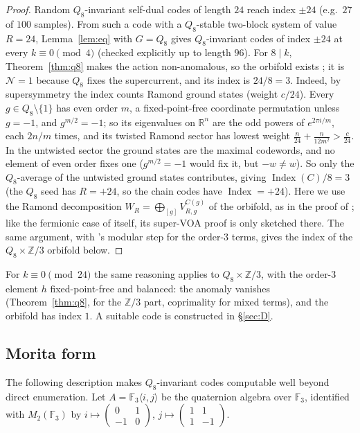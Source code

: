 \documentclass[11pt]{amsart}
\theoremstyle{definition}
\newcommand{\F}{\mathbb{F}_3}
\newcommand{\Index}{\operatorname{Index}}
\begin{document}
\begin{proof}
Random $Q_8$-invariant self-dual codes of length $24$ reach index $\pm24$ (e.g.\ $27$ of $100$
samples). From such a code with a $Q_8$-stable two-block system of value $R=24$, Lemma~\ref{lem:eq}
with $G=Q_8$ gives $Q_8$-invariant codes of index $\pm24$ at every $k\equiv0\pmod4$ (checked explicitly
up to length $96$). For $8\mid k$, Theorem~\ref{thm:q8} makes the action non-anomalous, so the orbifold
exists \cite[Thm.~4.2]{GJF}; it is $\mathcal N=1$ because $Q_8$ fixes the supercurrent, and its index
is $24/8=3$. Indeed, by supersymmetry the index counts Ramond ground states (weight $c/24$). Every
$g\in Q_8\setminus\{1\}$ has even order $m$, a fixed-point-free coordinate permutation unless $g=-1$, and
$g^{m/2}=-1$; so its eigenvalues on $\mathbb R^n$ are the odd powers of $e^{2\pi i/m}$, each $2n/m$ times, and
its twisted Ramond sector has lowest weight $\tfrac n{24}+\tfrac n{12m^2}>\tfrac c{24}$. In the untwisted sector
the ground states are the maximal codewords, and no element of even order fixes one ($g^{m/2}=-1$ would fix it,
but $-w\ne w$).
So only the $Q_8$-average of the untwisted ground states contributes, giving $\Index(C)/8=3$ (the $Q_8$ seed has
$R=+24$, so the chain codes have $\Index=+24$). Here we use the Ramond decomposition
$W_R=\bigoplus_{[g]}V_{R,g}^{C(g)}$ of the orbifold, as in the proof of \cite[Thm.~5.6]{GJF}; like the fermionic
case of \cite[Thm.~4.2]{GJF} itself, its super-VOA proof is only sketched there. The same argument,
with \cite{GJF}'s modular step for the order-$3$ terms, gives the index of the $Q_8\times\mathbb Z/3$ orbifold
below.
\end{proof}

For $k\equiv0\pmod{24}$ the same reasoning applies to $Q_8\times\mathbb Z/3$, with the order-$3$
element $h$ fixed-point-free and balanced: the anomaly vanishes (Theorem~\ref{thm:q8}, \cite{GJF} for
the $\mathbb Z/3$ part, coprimality for mixed terms), and the orbifold has index $1$. A suitable code is
constructed in \S\ref{sec:D}.

\subsection{Morita form}\label{sec:morita}
The following description makes $Q_8$-invariant codes computable well beyond direct enumeration.
Let $A=\F\langle i,j\rangle$ be the quaternion algebra over $\F$, identified with $M_2(\F)$ by
$i\mapsto\left(\begin{smallmatrix}0&1\\-1&0\end{smallmatrix}\right)$,
$j\mapsto\left(\begin{smallmatrix}1&1\\1&-1\end{smallmatrix}\right)$.
\end{document}
